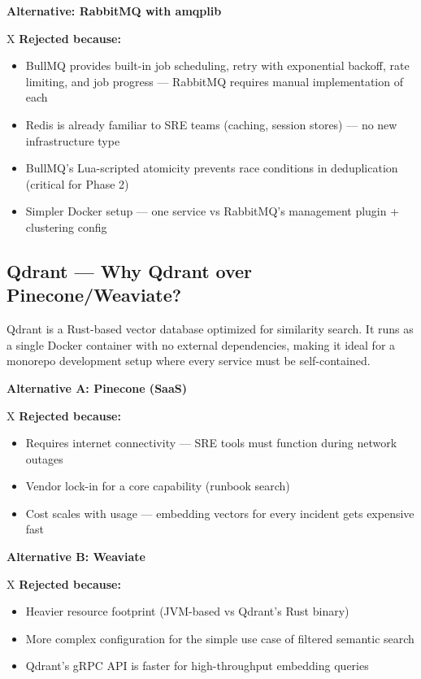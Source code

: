 \documentclass[11pt,a4paper]{article}
\begin{document}
\begin{alternativebox}
\textbf{Alternative: RabbitMQ with amqplib}

X \textbf{Rejected because:}
\begin{itemize}[leftmargin=*,itemsep=2pt]
  \item BullMQ provides built-in job scheduling, retry with exponential backoff, rate limiting, and job progress — RabbitMQ requires manual implementation of each
  \item Redis is already familiar to SRE teams (caching, session stores) — no new infrastructure type
  \item BullMQ's Lua-scripted atomicity prevents race conditions in deduplication (critical for Phase 2)
  \item Simpler Docker setup — one service vs RabbitMQ's management plugin + clustering config
\end{itemize}
\end{alternativebox}

\subsection{Qdrant — Why Qdrant over Pinecone/Weaviate?}

\begin{decisionbox}
Qdrant is a Rust-based vector database optimized for similarity search. It runs as a
single Docker container with no external dependencies, making it ideal for a monorepo
development setup where every service must be self-contained.
\end{decisionbox}

\begin{alternativebox}
\textbf{Alternative A: Pinecone (SaaS)}

X \textbf{Rejected because:}
\begin{itemize}[leftmargin=*,itemsep=2pt]
  \item Requires internet connectivity — SRE tools must function during network outages
  \item Vendor lock-in for a core capability (runbook search)
  \item Cost scales with usage — embedding vectors for every incident gets expensive fast
\end{itemize}

\vspace{6pt}
\textbf{Alternative B: Weaviate}

X \textbf{Rejected because:}
\begin{itemize}[leftmargin=*,itemsep=2pt]
  \item Heavier resource footprint (JVM-based vs Qdrant's Rust binary)
  \item More complex configuration for the simple use case of filtered semantic search
  \item Qdrant's gRPC API is faster for high-throughput embedding queries
\end{itemize}
\end{alternativebox}
\end{document}
